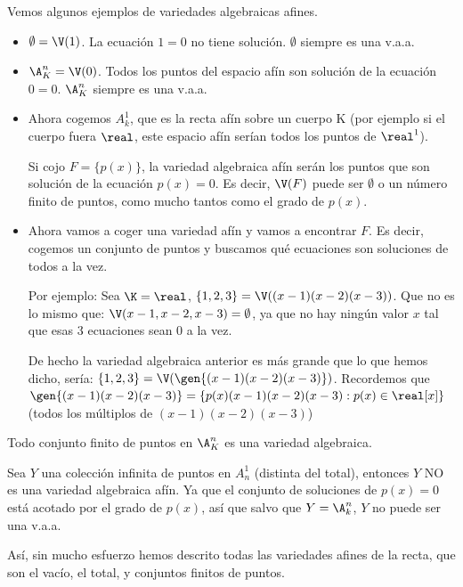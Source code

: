 Vemos algunos ejemplos de variedades algebraicas afines.
\begin{example}
	\begin{itemize}
		\item $\emptyset = \V(1)$. La ecuación $1=0$ no tiene solución. $\emptyset$ siempre es una v.a.a.
		\item $\A_K^n=\V(0)$. Todos los puntos del espacio afín son solución de la ecuación $0=0$. $\A_K^n$ siempre es una v.a.a.
		\item Ahora cogemos $A^1_k$, que es la recta afín sobre un cuerpo K (por ejemplo si el cuerpo fuera $\real$, este espacio afín serían todos los puntos de $\real^1$).
		
		Si cojo $F=\{p(x)\}$, la variedad algebraica afín serán los puntos que son solución de la ecuación $p(x)=0$. Es decir, $\V(F)$ puede ser $\emptyset$ o un número finito de puntos, como mucho tantos como el grado de $p(x)$.
		\item Ahora vamos a coger una variedad afín y vamos a encontrar $F$. Es decir, cogemos un conjunto de puntos y buscamos qué ecuaciones son soluciones de todos a la vez.
		
		Por ejemplo: Sea $\K=\real$, $\{1,2,3\} =\V((x-1)(x-2)(x-3))$. Que no es lo mismo que: $\V(x-1,x-2,x-3)=\emptyset$, ya que no hay ningún valor $x$ tal que esas 3 ecuaciones sean 0 a la vez. 
		
		De hecho la variedad algebraica anterior es más grande que lo que hemos dicho, sería: $\{1,2,3\} =\V(\gen{(x-1)(x-2)(x-3)})$. Recordemos que $\gen{(x-1)(x-2)(x-3)} = \{ p(x)(x-1)(x-2)(x-3) : p(x) \in \real[x] \}$ (todos los múltiplos de $(x-1)(x-2)(x-3)$)
	\end{itemize}
\end{example}

\obs Todo conjunto finito de puntos en $\A_K^n$ es una variedad algebraica.

\obs Sea $Y$ una colección infinita de puntos en $A^1_n$ (distinta del total), entonces $Y$ NO es una variedad algebraica afín. Ya que el conjunto de soluciones de $p(x)=0$ está acotado por el grado de $p(x)$, así que salvo que $Y=\A^n_k$, $Y$ no puede ser una v.a.a.

Así, sin mucho esfuerzo hemos descrito todas las variedades afines de la recta, que son el vacío, el total, y conjuntos finitos de puntos.

